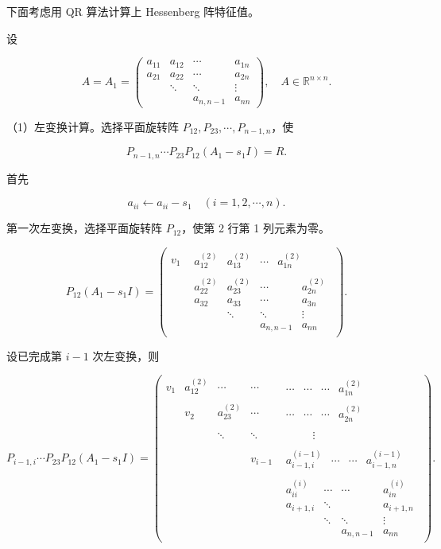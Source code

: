 \documentclass[
  10pt,
  fontset=fandol]{ctexart}
\begin{document}
下面考虑用 QR 算法计算上 Hessenberg 阵特征值。

设

\[
A=A_1=\begin{pmatrix}
a_{11}&a_{12}&\cdots&a_{1n}\\
a_{21}&a_{22}&\cdots&a_{2n}\\
&\ddots&\ddots&\vdots\\
&&a_{n,n-1}&a_{nn}
\end{pmatrix},\quad A\in\mathbb R^{n\times n}.
\]

（1）左变换计算。选择平面旋转阵 \(P_{12},P_{23},\cdots,P_{n-1,n}\)，使

\[
P_{n-1,n}\cdots P_{23}P_{12}(A_1-s_1I)=R.
\]

首先

\[
a_{ii}\leftarrow a_{ii}-s_1\quad(i=1,2,\cdots,n).
\]

第一次左变换，选择平面旋转阵 \(P_{12}\)，使第 2 行第 1 列元素为零。

\[
P_{12}(A_1-s_1I)=\begin{pmatrix}
v_1&\begin{matrix}a_{12}^{(2)}&a_{13}^{(2)}&\cdots&a_{1n}^{(2)}\end{matrix}\\
&\boxed{\begin{matrix}
a_{22}^{(2)}&a_{23}^{(2)}&\cdots&a_{2n}^{(2)}\\
a_{32}&a_{33}&\cdots&a_{3n}\\
&\ddots&\ddots&\vdots\\
&&a_{n,n-1}&a_{nn}
\end{matrix}}
\end{pmatrix}.
\]

设已完成第 \(i-1\) 次左变换，则

\[
P_{i-1,i}\cdots P_{23}P_{12}(A_1-s_1I)
=\begin{pmatrix}
v_1&a_{12}^{(2)}&\cdots&\cdots&\begin{matrix}\cdots&\cdots&\cdots&a_{1n}^{(2)}\end{matrix}\\
&v_2&a_{23}^{(2)}&\cdots&\begin{matrix}\cdots&\cdots&\cdots&a_{2n}^{(2)}\end{matrix}\\
&&\ddots&\ddots&\begin{matrix}&&&\vdots\end{matrix}\\
&&&v_{i-1}&\begin{matrix}a_{i-1,i}^{(i-1)}&\cdots&\cdots&a_{i-1,n}^{(i-1)}\end{matrix}\\
&&&&\boxed{\begin{matrix}
a_{ii}^{(i)}&\cdots&\cdots&a_{in}^{(i)}\\
a_{i+1,i}&\ddots&&a_{i+1,n}\\
&\ddots&\ddots&\vdots\\
&&a_{n,n-1}&a_{nn}
\end{matrix}}
\end{pmatrix}.
\]
\end{document}
